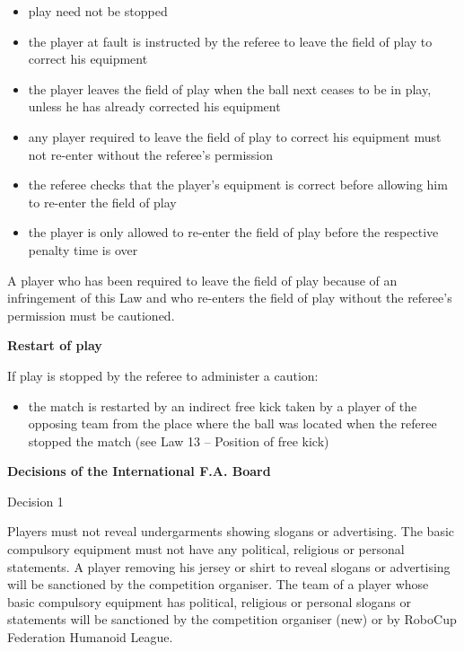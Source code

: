 \begin{itemize}
\item play need not be stopped
\item the player at fault is instructed by the referee to leave the field of play to correct his equipment
\item the player leaves the field of play when the ball next ceases to be in play, unless he has already corrected his equipment
\item any player required to leave the field of play to correct his equipment must not re-enter without the referee's permission
\item the referee checks that the player's equipment is correct before allowing him to re-enter the field of play 
\item the player is only allowed to re-enter the field of play before the respective penalty time is over 
\end{itemize}

\bigskip

A player who has been required to leave the field of play because of an infringement of this Law and who re-enters the field of play without the referee's permission must be cautioned.

\bigskip

\clearpage
{\bfseries Restart of play}

\headlinebox

If play is stopped by the referee to administer a caution:

\begin{itemize}
\item the match is restarted by an indirect free kick taken by a player of the opposing team from the place where the ball was located when the referee stopped the match (see Law 13 -- Position of free kick)
\end{itemize}

\bigskip


{\bfseries Decisions of the International F.A. Board }

\headlinebox

Decision 1

Players must not reveal undergarments showing slogans or advertising. The basic compulsory equipment must not have any political, religious or personal statements. A player removing his jersey or shirt to reveal slogans or advertising will be sanctioned by the competition organiser. The team of a player whose basic compulsory equipment has political, religious or personal slogans or statements will be sanctioned by the competition organiser (new) or by RoboCup Federation Humanoid League.
